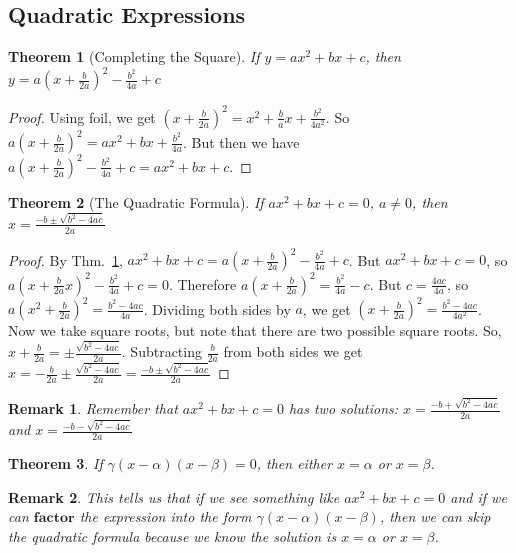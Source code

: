 \documentclass{article}
\theoremstyle{mystyle}
\newtheorem{theorem}{Theorem}[section]
\newtheorem{remark}{Remark}[section]
\begin{document}
\subsection{Quadratic Expressions}
\begin{theorem}[Completing the Square]
\label{theorem:north_shore_completing_the_square}
If $y = ax^2 +bx +c$, then $y = a(x+\frac{b}{2a})^2 - \frac{b^2}{4a}+c$
\end{theorem}
\begin{proof}
Using \gls{foil}, we get $(x+\frac{b}{2a})^2 = x^2 + \frac{b}{a}x + \frac{b^2}{4a^2}$. So $a(x+\frac{b}{2a})^2 = ax^2 + bx + \frac{b^2}{4a}$. But then we have $a(x+\frac{b}{2a})^2 - \frac{b^2}{4a} + c = ax^2 + bx +c$.
\end{proof}
\begin{theorem}[The Quadratic Formula]
\label{theorem:north_shore_quadratic_formula_theorem}
If $ax^2 + bx + c = 0$, $a\ne 0$, then $x = \frac{-b\pm \sqrt{b^2 - 4ac}}{2a}$
\end{theorem}
\begin{proof}
By Thm.~\ref{theorem:north_shore_completing_the_square}, $ax^2 + bx + c = a(x+\frac{b}{2a})^2 - \frac{b^2}{4a} + c$. But $ax^2 + bx + c = 0$, so $a(x+\frac{b}{2a}x)^2 - \frac{b^2}{4a} + c = 0$. Therefore $a(x+\frac{b}{2a})^2 = \frac{b^2}{4a} - c$. But $c = \frac{4ac}{4a}$, so $a(x^2+\frac{b}{2a})^2 = \frac{b^2-4ac}{4a}$. Dividing both sides by $a$, we get $(x+\frac{b}{2a})^2 = \frac{b^2-4ac}{4a^2}$. Now we take square roots, but note that there are two possible square roots. So, $x+\frac{b}{2a} = \pm \frac{\sqrt{b^2 - 4ac}}{2a}$. Subtracting $\frac{b}{2a}$ from both sides we get $x = -\frac{b}{2a} \pm \frac{\sqrt{b^2-4ac}}{2a} = \frac{-b \pm \sqrt{b^2 - 4ac}}{2a}$
\end{proof}
\begin{remark}
Remember that $ax^2 +bx +c = 0$ has two solutions: $x = \frac{-b + \sqrt{b^2 - 4ac}}{2a}$ and $x = \frac{-b - \sqrt{b^2-4ac}}{2a}$
\end{remark}
\begin{theorem}
\label{theorem:north_shore_zeros_of_a_factored_polynomial}
If $\gamma(x-\alpha)(x-\beta) = 0$, then either $x=\alpha$ or $x=\beta$.
\end{theorem}
\begin{remark}
This tells us that if we see something like $ax^2+bx+c = 0$ and if we can $\mathbf{factor}$ the expression into the form $\gamma(x-\alpha)(x-\beta)$, then we can skip the quadratic formula because we know the solution is $x = \alpha$ or $x=\beta$.
\end{remark}
\end{document}

